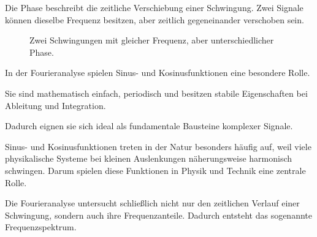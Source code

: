 
Die Phase beschreibt die zeitliche Verschiebung einer Schwingung.
Zwei Signale können dieselbe Frequenz besitzen,
aber zeitlich gegeneinander verschoben sein.
\FloatBarrier
\begin{figure}[H]
	\centering
	\caption{Zwei Schwingungen mit gleicher Frequenz,
		aber unterschiedlicher Phase.}
	\label{fig:phase}
\end{figure}

\begin{MathBox}
	\small
	\label{box:fourier-sinus-grundbaustein}
	In der Fourieranalyse spielen Sinus- und Kosinusfunktionen
	eine besondere Rolle.
	
	Sie sind mathematisch einfach,
	periodisch
	und besitzen stabile Eigenschaften bei Ableitung und Integration.
	
	Dadurch eignen sie sich ideal als fundamentale Bausteine komplexer Signale.
\end{MathBox}

Sinus- und Kosinusfunktionen treten in der Natur besonders häufig auf,
weil viele physikalische Systeme bei kleinen Auslenkungen
näherungsweise harmonisch schwingen.
Darum spielen diese Funktionen in Physik und Technik eine zentrale Rolle.

Die Fourieranalyse untersucht schließlich nicht nur den zeitlichen Verlauf einer Schwingung,
sondern auch ihre Frequenzanteile.
Dadurch entsteht das sogenannte Frequenzspektrum.

